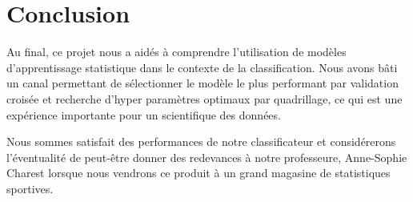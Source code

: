 \section{Conclusion}
Au final, ce projet nous a aidés à comprendre l’utilisation de modèles d’apprentissage statistique dans le contexte de la classification. Nous avons bâti un canal permettant de sélectionner le modèle le plus performant par validation croisée et recherche d’hyper paramètres optimaux par quadrillage, ce qui est une expérience importante pour un scientifique des données. 

Nous sommes satisfait des performances de notre classificateur et considérerons l'éventualité de peut-être donner des redevances à notre professeure, Anne-Sophie Charest lorsque nous vendrons ce produit à un grand magasine de statistiques sportives. 
